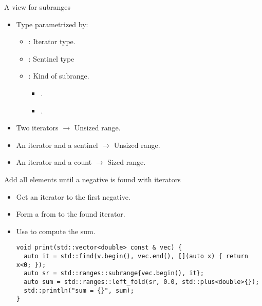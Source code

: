 \begin{frame}[t,fragile]{A view for subranges}
\begin{itemize}
  \item Type  parametrized by:
    \begin{itemize}
      \item {}: Iterator type.
      \item {}: Sentinel type
      \item {}: Kind of subrange.
        \begin{itemize}
          \item {}.
          \item {}.
        \end{itemize}    
    \end{itemize}

  \item Two iterators $\rightarrow$ Unsized range.
  \item An iterator and a sentinel $\rightarrow$ Unsized range.
  \item An iterator and a count $\rightarrow$ Sized range.
\end{itemize}
\end{frame}

\begin{frame}[t,fragile]{Add all elements until a negative is found with
iterators}
\begin{itemize}
  \item Get an iterator to the first negative.
  \item Form a  from  to the found iterator.
  \item Use  to compute the sum.

\begin{lstlisting}
void print(std::vector<double> const & vec) {
  auto it = std::find(v.begin(), vec.end(), [](auto x) { return x<0; });
  auto sr = std::ranges::subrange{vec.begin(), it};
  auto sum = std::ranges::left_fold(sr, 0.0, std::plus<double>{});
  std::println("sum = {}", sum);
}
\end{lstlisting}
\end{itemize}
\end{frame}

